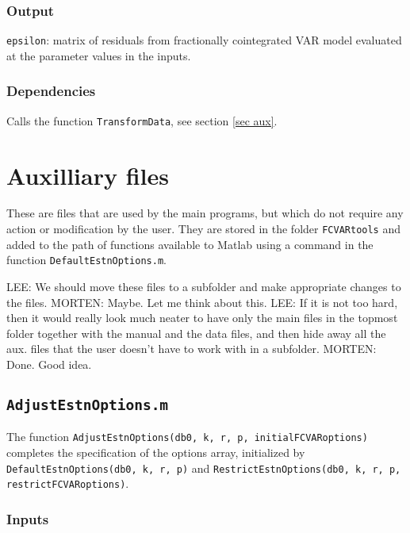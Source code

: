 \documentclass[12pt]{article}
\begin{document}
\subsubsection*{Output}

\texttt{epsilon}: matrix of residuals from fractionally cointegrated VAR model evaluated at the parameter values in the inputs.


\subsubsection*{Dependencies} 

Calls the function \texttt{TransformData}, see section \ref{sec aux}. 





\newpage

\section{Auxilliary files\label{sec aux}}

These are files that are used by the main programs, but which do not require any action or modification by the user. They are stored in the folder \texttt{FCVARtools} and added to the path of  functions available to Matlab using a command in the function \texttt{DefaultEstnOptions.m}.

LEE: We should move these files to a subfolder and make appropriate changes to the files.
MORTEN: Maybe. Let me think about this.
LEE: If it is not too hard, then it would really look much neater to have only the main files in the topmost folder together with the manual and the data files, and then hide away all the aux. files that the user doesn't have to work with in a subfolder.
MORTEN: Done. Good idea.


\subsection{\texttt{AdjustEstnOptions.m}\label{sec adjust}}

The function \texttt{AdjustEstnOptions(db0, k, r, p, initialFCVARoptions)} completes the specification of the options array, initialized by \texttt{DefaultEstnOptions(db0, k, r, p)} and \texttt{RestrictEstnOptions(db0, k, r, p, restrictFCVARoptions)}.


\subsubsection*{Inputs}
\end{document}
